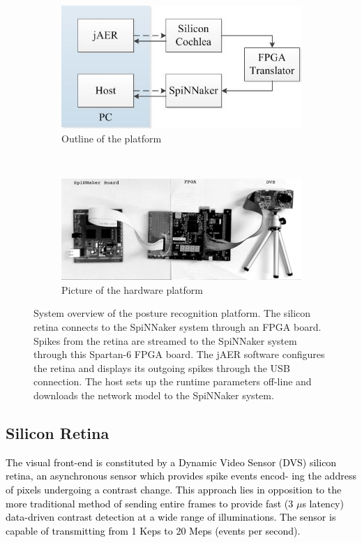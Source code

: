 \documentclass[journal]{journal}
\begin{document}
\begin{figure}
\centering
	\begin{subfigure}[t]{0.42\textwidth}
		\includegraphics[width=\textwidth]{pics/outline.jpg}
	    \caption{Outline of the platform}
	    \label{fig:SysOverViewa}
	\end{subfigure}
	\\
	\begin{subfigure}[t]{0.42\textwidth}
		\includegraphics[width=\textwidth]{pics/dvs_spinnaker.png}	    \caption{Picture of the hardware platform}
	    \label{fig:SysOverViewb}
	\end{subfigure}	

\caption{System overview of the posture recognition platform. The silicon retina connects to the SpiNNaker system through an FPGA board. 
Spikes from the retina are streamed to the SpiNNaker system through this Spartan-6 FPGA board.
The jAER software configures the retina and displays its outgoing spikes through the USB connection.
The host sets up the runtime parameters off-line and downloads the network model to the SpiNNaker system.
}
\label{fig:SysOverView}
\end{figure}

\subsection{Silicon Retina}
\textcolor{black}{
The visual front-end is constituted by a Dynamic Video Sensor (DVS) silicon retina, an asynchronous sensor which provides spike events encod-
ing the address of pixels undergoing a contrast change\cite{wei2006robust}. 
This approach lies in opposition to the more traditional method of sending entire frames to provide fast (3 $\mu$s latency) data-driven contrast detection at a wide range of illuminations. 
The sensor is capable of transmitting from 1 Keps to 20 Meps (events per
second).}
\end{document}
